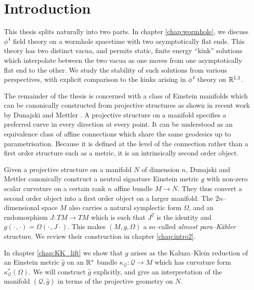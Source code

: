 

\chapter{Introduction}\label{chap:intro}


This thesis splits naturally into two parts. In chapter \ref{chap:wormhole}, we discuss $\phi^4$ field theory on a wormhole spacetime with two asymptotically flat ends. This theory has two distinct vacua, and permits static, finite energy ``kink'' solutions which interpolate between the two vacua as one moves from one asymptotically flat end to the other. We study the stability of such solutions from various perspectives, with explicit comparison to the kinks arising in $\phi^4$ theory on $\mathbb{R}^{1,1}$.

The remainder of the thesis is concerned with a class of Einstein manifolds which can be canonically constructed from projective structures as shown in recent work by Dunajski and Mettler \cite{DM}. A projective structure on a manifold specifies a preferred curve in every direction at every point. It can be understood as an equivalence class of affine connections which share the same geodesics up to parametrisation. Because it is defined at the level of the connection rather than a first order structure such as a metric, it is an intrinsically second order object.

Given a projective structure on a manifold $N$ of dimension $n$,
Dunajski and Mettler \cite{DM} canonically construct a neutral signature Einstein metric $g$ with non-zero
scalar curvature on a certain rank $n$ affine bundle $M\rightarrow N$. They thus convert a second order object into a first order object on a larger manifold.
The $2n$--dimensional space $M$ also carries a natural symplectic form $\Omega$, and an endomorphism $J:TM\rightarrow TM$ which is such that $J^2$ is the identity and $g(\cdot\,,\cdot)=\Omega(\cdot\,,J\cdot)$. This makes $(M,g,\Omega)$ a so--called \textit{almost para--K\"ahler} structure. We review their construction in chapter \ref{chap:intro2}.

In chapter \ref{chap:KK_lift} we show that $g$ arises as the Kaluza--Klein reduction of an Einstein metric $\hat{g}$ on an $\mathbb{R}^*$ bundle $\kappa_\mathcal{Q}:\mathcal{Q}\rightarrow M$ which has curvature form $\kappa_\mathcal{Q}^*(\Omega)$. We will construct $\hat{g}$ explicitly, and give an interpretation of the manifold $(\mathcal{Q},\hat{g})$ in terms of the projective geometry on $N$.

